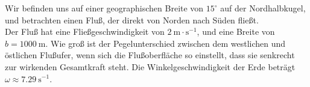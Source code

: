 \begin{minipage}[b]{0.75\textwidth}
\begin{Exercise}[difficulty = 3, origin = Orpheus e.V, title = Fluß, label = cori1]
	Wir befinden uns auf einer geographischen Breite von $15^\circ$ auf der Nordhalbkugel, und betrachten einen Fluß, der direkt von Norden nach Süden fließt.\\ Der Fluß hat eine Fließgeschwindigkeit von $2~\mathrm{m\cdot s^{-1}}$, und eine Breite von $b = 1000~\mathrm{m}$. Wie groß ist der Pegelunterschied zwischen dem westlichen und östlichen Flußufer, wenn sich die Flußoberfläche so einstellt, dass sie senkrecht zur wirkenden Gesamtkraft steht. Die Winkelgeschwindigkeit der Erde beträgt $\omega \approx 7.29~\mathrm{s^{-1}}$.
\end{Exercise}
\end{minipage}
\hfill
\begin{minipage}[b]{0.2\textwidth}
	
\end{minipage}
